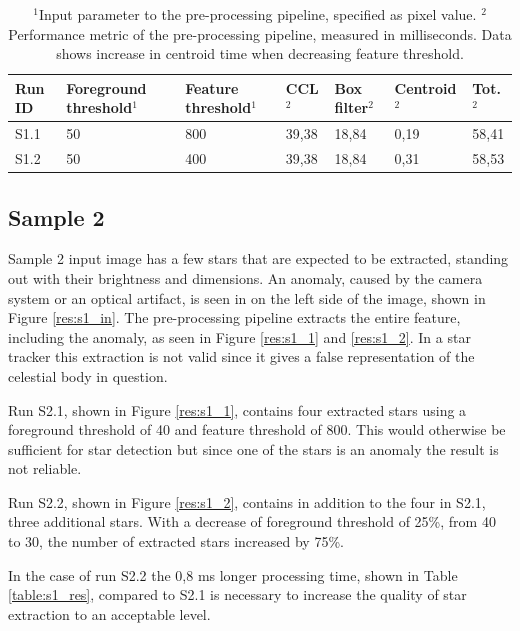 \documentclass[12pt]{report}
\begin{document}
\begin{table}[!h]
    \centering
    \begin{tabular}{|p{0.8cm}|p{2.5cm}|p{2cm}||p{1.25cm}|p{1.25cm}|p{1.9cm}|p{1cm}|}
        \hline
        \textbf{Run ID}&\textbf{Foreground threshold$^{1}$}&\textbf{Feature threshold$^{1}$}&\textbf{CCL$^{2}$}&\textbf{Box filter$^{2}$}&\textbf{Centroid$^{2}$}&\textbf{Tot.$^{2}$}\\
        \hline
        \hline
        S1.1&50&800&39,38&18,84&0,19&58,41\\
        \hline
        S1.2&50&400&39,38&18,84&0,31&58,53\\
        \hline
    \end{tabular}
    \caption{$^{1}$Input parameter to the pre-processing pipeline, specified as pixel value. $^{2}$Performance metric of the pre-processing pipeline, measured in milliseconds. Data shows increase in centroid time when decreasing feature threshold.}
    \label{table:s0_res}
\end{table}

\subsection*{Sample 2}
Sample 2 input image has a few stars that are expected to be extracted, standing out with their brightness and dimensions. An anomaly, caused by the camera system or an optical artifact, is seen in on the left side of the image, shown in Figure \ref{res:s1_in}. The pre-processing pipeline extracts the entire feature, including the anomaly, as seen in Figure \ref{res:s1_1} and \ref{res:s1_2}. In a star tracker this extraction is not valid since it gives a false representation of the celestial body in question.
\par
Run S2.1, shown in Figure \ref{res:s1_1}, contains four extracted stars using a foreground threshold of 40 and feature threshold of 800. This would otherwise be sufficient for star detection but since one of the stars is an anomaly the result is not reliable.
\par
Run S2.2, shown in Figure \ref{res:s1_2}, contains in addition to the four in S2.1, three additional stars. With a decrease of foreground threshold of 25\%, from 40 to 30, the number of extracted stars increased by 75\%.
\par
In the case of run S2.2 the 0,8 ms longer processing time, shown in Table \ref{table:s1_res}, compared to S2.1 is necessary to increase the quality of star extraction to an acceptable level.
\end{document}
